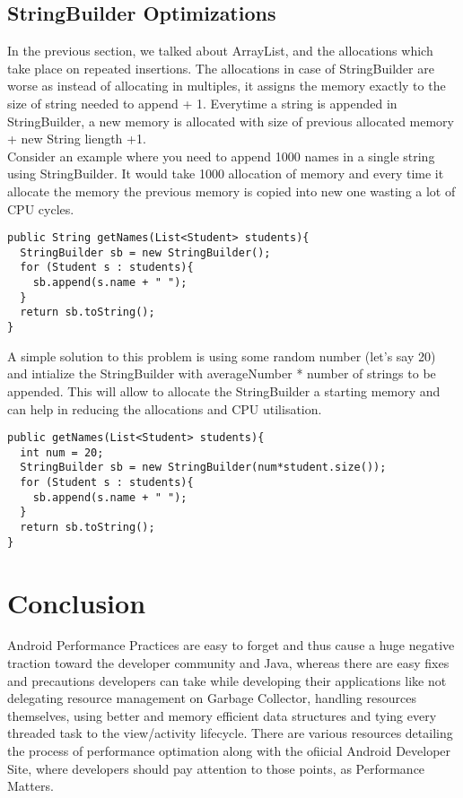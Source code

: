 \documentclass[journal]{IEEEtran}
\begin{document}
\subsection{StringBuilder Optimizations}
In the previous section, we talked about ArrayList, and the allocations which take place on repeated insertions. The allocations in case of StringBuilder are worse as instead of allocating in multiples, it assigns the memory exactly to the size of string needed to append + 1. Everytime a string is appended in StringBuilder, a new memory is allocated with size of previous allocated memory + new String liength +1.\\
Consider an example where you need to append 1000 names in a single string using StringBuilder. It would take 1000 allocation of memory and every time it allocate the memory the previous memory is copied into new one wasting a lot of CPU cycles.
\begin{verbatim}
public String getNames(List<Student> students){
  StringBuilder sb = new StringBuilder();
  for (Student s : students){
    sb.append(s.name + " ");
  }
  return sb.toString();
}
\end{verbatim}
A simple solution to this problem is using some random number (let's say 20) and intialize the StringBuilder with averageNumber * number of strings to be appended. This will allow to allocate the StringBuilder a starting memory and can help in reducing the allocations and CPU utilisation.
\begin{verbatim}
public getNames(List<Student> students){
  int num = 20;
  StringBuilder sb = new StringBuilder(num*student.size());
  for (Student s : students){
    sb.append(s.name + " ");
  }
  return sb.toString();
}
\end{verbatim}

\section{Conclusion}
Android Performance Practices are easy to forget and thus cause a huge negative traction toward the developer community and Java, whereas there are easy fixes and precautions developers can take while developing their applications like not delegating resource management on Garbage Collector, handling resources themselves, using better and memory efficient data structures and tying every threaded task to the view/activity lifecycle. There are various resources detailing the process of performance optimation along with the ofiicial Android Developer Site, where developers should pay attention to those points, as Performance Matters.
\end{document}
